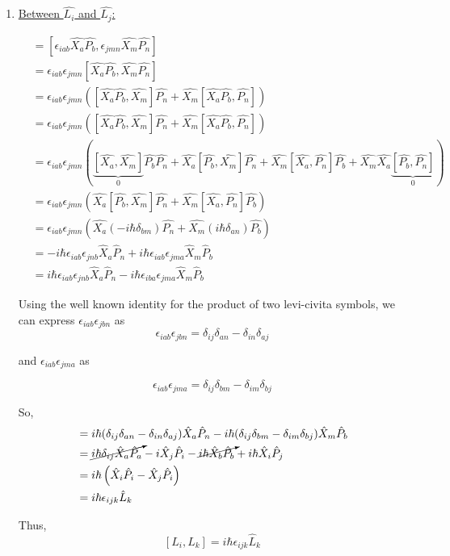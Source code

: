 \documentclass{article}
\begin{document}
\begin{enumerate}
  \item \underline{Between $\hat{L_i}$ and $\hat{L_j}$:}
  
  \begin{align*}
    [L_i, L_j] &= [\epsilon_{iab} \hat{X_a} \hat{P_b}, \epsilon_{jmn} \hat{X_m} \hat{P_n}] \\
    &= \epsilon_{iab} \epsilon_{jmn} [\hat{X_a}\hat{P_b}, \hat{X_m} \hat{P_n}] \\
    &=\epsilon_{iab} \epsilon_{jmn} \left(  [\hat{X_a}\hat{P_b}, \hat{X_m}] \hat{P_n} +  \hat{X_m} [\hat{X_a}\hat{P_b}, \hat{P_n}] \right) \\
    &=\epsilon_{iab} \epsilon_{jmn} \left(  [\hat{X_a}\hat{P_b}, \hat{X_m}] \hat{P_n} +  \hat{X_m} [\hat{X_a}\hat{P_b}, \hat{P_n}] \right) \\
    &=\epsilon_{iab} \epsilon_{jmn} \left(  \underbrace{[\hat{X_a}, \hat{X_m}]}_{0} \hat{P_b} \hat{P_n} + \hat{X_a}[\hat{P_b}, \hat{X_m}] \hat{P_n} +  \hat{X_m} [\hat{X_a}, \hat{P_n}]\hat{P_b} + \hat{X_m} \hat{X_a} \underbrace{[\hat{P_b}, \hat{P_n}]}_{0}  \right) \\ 
    &=\epsilon_{iab} \epsilon_{jmn} \left(\hat{X_a}[\hat{P_b}, \hat{X_m}] \hat{P_n} +  \hat{X_m} [\hat{X_a}, \hat{P_n}]\hat{P_b} \right) \\
    &=\epsilon_{iab} \epsilon_{jmn} \left(\hat{X_a}(-i\hbar\delta_{bm}) \hat{P_n} +  \hat{X_m} (i\hbar\delta_{an})\hat{P_b} \right) \\
    &= -i\hbar\epsilon_{iab}\epsilon_{jnb} \hat{X}_a \hat{P}_n + i\hbar \epsilon_{iab} \epsilon_{jma} \hat{X}_m \hat{P}_b \\
    &= i\hbar\epsilon_{iab}\epsilon_{jnb} \hat{X}_a \hat{P}_n - i\hbar \epsilon_{iba} \epsilon_{jma} \hat{X}_m \hat{P}_b
  \end{align*}

  Using the well known identity for the product of two levi-civita symbols, we can express $\epsilon_{iab} \epsilon_{jbn}$ as 
  \[ \epsilon_{iab} \epsilon_{jbn} = \delta_{ij} \delta_{an} - \delta_{in} \delta_{aj} \]

  and $\epsilon_{iab} \epsilon_{jma}$ as 

  \[ \epsilon_{iab} \epsilon_{jma} = \delta_{ij} \delta_{bm} - \delta_{im} \delta_{bj}  \]

  So, 
  \begin{align*}
    [\hat{L}_i, \hat{L}_j] &= i\hbar(\delta_{ij} \delta_{an} - \delta_{in} \delta_{aj} )\hat{X}_a \hat{P}_n - i\hbar (\delta_{ij} \delta_{bm} - \delta_{im} \delta_{bj}) \hat{X}_m \hat{P}_b \\
    &= \cancelto{}{i\hbar\delta_{ij} \hat{X}_a \hat{P}_a} - i \hat{X}_j \hat{P}_i - \cancelto{}{i\hbar \hat{X}_b \hat{P}_b} + i\hbar \hat{X}_i \hat{P}_j \\
    &= i\hbar\left( \hat{X}_i\hat{P}_i - \hat{X}_j \hat{P}_i \right) \\
    &= i\hbar \epsilon_{ijk} \hat{L}_k
  \end{align*} 

  Thus, 
  \[ \boxed{[L_i, L_k] = i\hbar \epsilon_{ijk} \hat{L}_k} \]
\end{enumerate}
\end{document}
